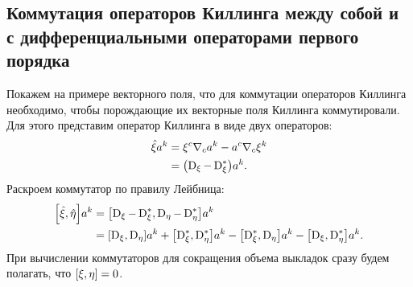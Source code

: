 \documentclass[12pt,a4paper]{article}
\begin{document}
        \subsection{Коммутация операторов Киллинга между собой и с дифференциальными операторами первого порядка}

            Покажем на примере векторного поля, что для коммутации операторов Киллинга необходимо, чтобы порождающие их векторные поля Киллинга коммутировали. Для этого представим оператор Киллинга в виде двух операторов:
            \begin{equation}\begin{aligned}
                \hat{\mathbf{\xi}} a^k
                    &= \xi^c \nabla_c a^k - a^c \nabla_c \xi^k \\
                    &= \qty(\operatorname{D}_\xi - \operatorname{D}^{*}_\xi) a^k .
            \end{aligned}\end{equation}
            Раскроем коммутатор по правилу Лейбница:
            \begin{equation}\begin{aligned}
                \comm{\Op{\xi}}{\Op{\eta}} a^k
                    &= \comm{\D_\xi - \D^{*}_\xi}{\D_\eta - \D^{*}_\eta} a^k \\
                    &= \comm{\D_\xi}{\D_\eta} a^k
                     + \comm{\D^{*}_\xi}{\D^{*}_\eta} a^k
                     - \comm{\D^{*}_\xi}{\D_\eta} a^k
                     - \comm{\D_\xi}{\D^{*}_\eta} a^k .
            \end{aligned}\end{equation}
            При вычислении коммутаторов для сокращения объема выкладок сразу будем полагать, что $\comm{\xi}{\eta} = 0$.
\end{document}
